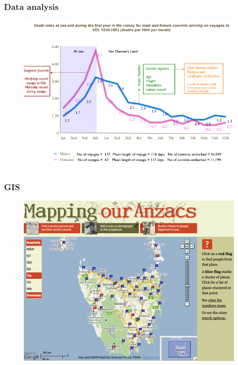\documentclass[ignorenonframetext,11pt]{beamer}
\begin{document}
\begin{frame}
\frametitle{Data analysis}
\label{dataanalysis}

\begin{figure}
	\label{deathrates}
	\begin{center}
	\includegraphics[keepaspectratio,width=\textwidth, height=.75\textheight]{images/deathrates.png}
	\end{center}
	\end{figure}
	



\end{frame}
		

\begin{frame}
\frametitle{GIS}
\label{gis}

\begin{figure}
	\label{mappingouranzacs}
	\begin{center}
	\includegraphics[keepaspectratio,width=\textwidth, height=.75\textheight]{images/mapping.png}
	\end{center}
	\end{figure}
	



\end{frame}
		
\end{document}
